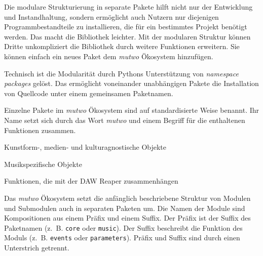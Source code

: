 \documentclass[12pt,a4paper,ngerman]{article}
\begin{document}
\bigskip

Die modulare Strukturierung in separate Pakete hilft nicht nur der Entwicklung und Instandhaltung, sondern ermöglicht auch Nutzern nur diejenigen Programmbestandteile zu installieren, die für ein bestimmtes Projekt benötigt werden.
Das macht die Bibliothek leichter.
Mit der modularen Struktur können Dritte unkompliziert die Bibliothek durch weitere Funktionen erweitern.
Sie können einfach ein neues Paket dem \emph{mutwo} Ökosystem hinzufügen.

\bigskip

Technisch ist die Modularität durch Pythons Unterstützung von \emph{namespace packages} gelöst.
Das ermöglicht voneinander unabhängigen Pakete die Installation von Quellcode unter einem gemeinsamen Paketnamen.

\bigskip

Einzelne Pakete im \emph{mutwo} Ökosystem sind auf standardisierte Weise benannt.
Ihr Name setzt sich durch das Wort \emph{mutwo} und einem Begriff für die enthaltenen Funktionen zusammen.

\bigskip

\hspace{0.5cm}
\begin{minipage}{0.95\textwidth}
    \begin{description}[style=multiline, leftmargin=3.25cm, font=\normalfont\emph]
        \item[mutwo.core] Kunstform-, medien- und kulturagnostische Objekte
        \item[mutwo.music] Musikspezifische Objekte
        \item[mutwo.reaper] Funktionen, die mit der DAW Reaper zusammenhängen
    \end{description}
\end{minipage}

\bigskip

Das \emph{mutwo} Ökosystem setzt die anfänglich beschriebene Struktur von Modulen und Submodulen auch in separaten Paketen um.
Die Namen der Module sind Kompositionen aus einem Präfix und einem Suffix.
Der Präfix ist der Suffix des Paketnamen (z.~B. \texttt{core} oder \texttt{music}).
Der Suffix beschreibt die Funktion des Moduls (z.~B. \texttt{events} oder \texttt{parameters}).
Präfix und Suffix sind durch einen Unterstrich getrennt.
\end{document}
